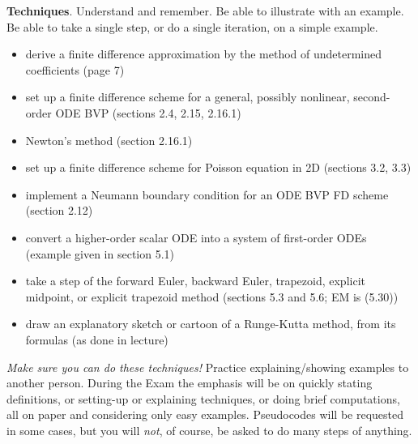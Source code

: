 \documentclass[12pt]{amsart}
\begin{document}
\bigskip

\noindent \textbf{Techniques}.  Understand and remember.  Be able to illustrate with an example.  Be able to take a single step, or do a single iteration, on a simple example.
\begin{itemize}
\item derive a finite difference approximation by the method of undetermined coefficients (page 7)
\item set up a finite difference scheme for a general, possibly nonlinear, second-order ODE BVP (sections 2.4, 2.15, 2.16.1)
\item Newton's method (section 2.16.1)
\item set up a finite difference scheme for Poisson equation in 2D (sections 3.2, 3.3)
\item implement a Neumann boundary condition for an ODE BVP FD scheme (section 2.12)
\item convert a higher-order scalar ODE into a system of first-order ODEs (example given in section 5.1)
\item take a step of the forward Euler, backward Euler, trapezoid, explicit midpoint, or explicit trapezoid method (sections 5.3 and 5.6; EM is (5.30))
\item draw an explanatory sketch or cartoon of a Runge-Kutta method, from its formulas (as done in lecture)
\end{itemize}

\medskip
\noindent \emph{Make sure you can do these techniques!}  Practice explaining/showing examples to another person.  During the Exam the emphasis will be on quickly stating definitions, or setting-up or explaining techniques, or doing brief computations, all on paper and considering only easy examples.  Pseudocodes will be requested in some cases, but you will \emph{not}, of course, be asked to do many steps of anything.
\vfill
\end{document}
